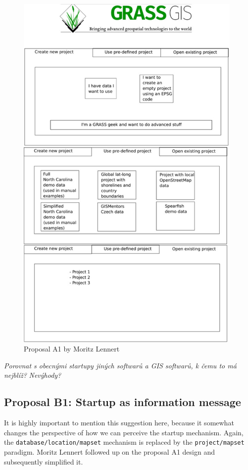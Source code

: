 \documentclass[a4paper,10pt,twoside]{article}
\begin{document}
\vspace{0.3cm}
\begin{figure}[hbt!] 
\begin{center}
\includegraphics[width=11cm]{pictures/proposalA1.png} 
\caption[Proposal A1 by Moritz Lennert]{Proposal A1 by Moritz Lennert}
\label{fig:proposalA1}
\end{center}
\end{figure}

\textit{\color{red} Porovnat s obecnými startupy jiných softwarů a GIS softwarů, k čemu to má nejblíž?}
\textit{\color{red} Nevýhody?}

\subsection{Proposal B1: Startup as information message}

It is highly important to mention this suggestion here, because it somewhat changes the perspective of how we can perceive the startup mechanism.  Again, the \texttt{database/location/mapset} mechanism is replaced by the \texttt{project/mapset} paradigm. Moritz Lennert followed up on the proposal A1 design and subsequently simplified it.
\end{document}
